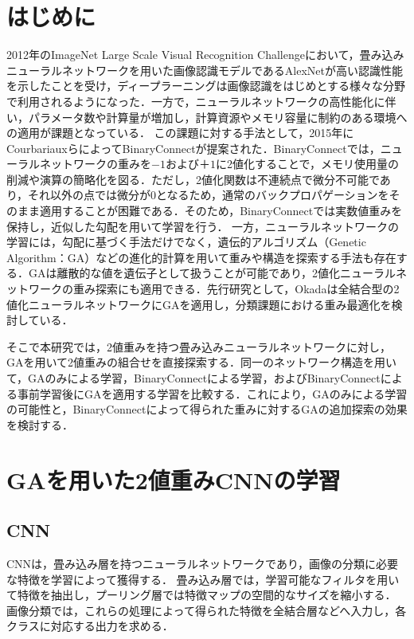 \documentclass[a4paper]{jarticle}
\begin{document}
\maketitle

\section{はじめに}
2012年のImageNet Large Scale Visual Recognition Challengeにおいて，畳み込みニューラルネットワークを用いた画像認識モデルであるAlexNetが高い認識性能を示したことを受け，ディープラーニングは画像認識をはじめとする様々な分野で利用されるようになった\cite{alexnet}．一方で，ニューラルネットワークの高性能化に伴い，パラメータ数や計算量が増加し，計算資源やメモリ容量に制約のある環境への適用が課題となっている．
この課題に対する手法として，2015年にCourbariauxらによってBinaryConnectが提案された\cite{binaryconnect}．BinaryConnectでは，ニューラルネットワークの重みを$−1$および$＋1$に2値化することで，メモリ使用量の削減や演算の簡略化を図る．ただし，2値化関数は不連続点で微分不可能であり，それ以外の点では微分が0となるため，通常のバックプロパゲーションをそのまま適用することが困難である．そのため，BinaryConnectでは実数値重みを保持し，近似した勾配を用いて学習を行う．
一方，ニューラルネットワークの学習には，勾配に基づく手法だけでなく，遺伝的アルゴリズム（Genetic Algorithm：GA）などの進化的計算を用いて重みや構造を探索する手法も存在する．GAは離散的な値を遺伝子として扱うことが可能であり，2値化ニューラルネットワークの重み探索にも適用できる．先行研究として，Okadaは全結合型の2値化ニューラルネットワークにGAを適用し，分類課題における重み最適化を検討している\cite{okada2021}．

そこで本研究では，2値重みを持つ畳み込みニューラルネットワークに対し，GAを用いて2値重みの組合せを直接探索する．同一のネットワーク構造を用いて，GAのみによる学習，BinaryConnectによる学習，およびBinaryConnectによる事前学習後にGAを適用する学習を比較する．これにより，GAのみによる学習の可能性と，BinaryConnectによって得られた重みに対するGAの追加探索の効果を検討する．

\section{GAを用いた2値重みCNNの学習}


\subsection{CNN}
CNNは，畳み込み層を持つニューラルネットワークであり，画像の分類に必要な特徴を学習によって獲得する\cite{lecun1998}．
畳み込み層では，学習可能なフィルタを用いて特徴を抽出し，プーリング層では特徴マップの空間的なサイズを縮小する．
画像分類では，これらの処理によって得られた特徴を全結合層などへ入力し，各クラスに対応する出力を求める．
\end{document}
